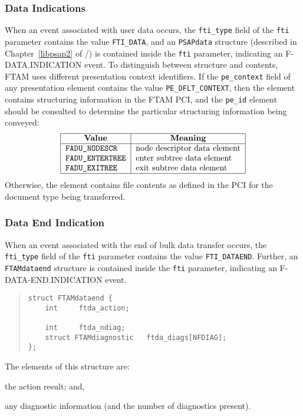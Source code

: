 \subsubsection	{Data Indications}\label{ftam:data}
When an event associated with user data occurs,
the \verb"fti_type" field of the \verb"fti" parameter contains the value
\verb"FTI_DATA",
and an \verb"PSAPdata" structure
(described in Chapter~\ref{libpsap2} of \voltwo/)
is contained inside the \verb"fti" parameter,
indicating an {\sf F-DATA.INDICATION\/} event.
To distinguish between structure and contents,
FTAM uses different presentation context identifiers.
If the \verb"pe_context" field of any presentation element contains the value
\verb"PE_DFLT_CONTEXT",
then the element contains structuring information in the FTAM PCI,
and the \verb"pe_id" element should be consulted to determine the particular
structuring information being conveyed:
\[\begin{tabular}{|l|l|}
\hline
    \multicolumn{1}{|c|}{\bf Value}&
		\multicolumn{1}{c|}{\bf Meaning}\\
\hline
    \tt FADU\_NODESCR&		node descriptor data element\\
    \tt FADU\_ENTERTREE&	enter subtree data element\\
    \tt FADU\_EXITREE&		exit subtree data element\\
\hline
\end{tabular}\]
Otherwise,
the element contains file contents as defined in the PCI for the
document type being transferred.

\subsubsection	{Data End Indication}
When an event associated with the end of bulk data transfer occurs,
the \verb"fti_type" field of the \verb"fti" parameter contains the value
\verb"FTI_DATAEND".
Further,
an \verb"FTAMdataend" structure is contained inside the \verb"fti" parameter,
indicating an {\sf F-DATA-END.INDICATION\/} event.
\begin{quote}\small\begin{verbatim}
struct FTAMdataend {
    int     ftda_action;

    int     ftda_ndiag;
    struct FTAMdiagnostic   ftda_diags[NFDIAG];
};
\end{verbatim}\end{quote}
The elements of this structure are:
\begin{describe}
\item[\verb"ftda\_action":] the action result;
and,

\item[\verb"ftda\_diags"/\verb"ftda\_ndiag":] any diagnostic information
(and the number of diagnostics present).
\end{describe}

